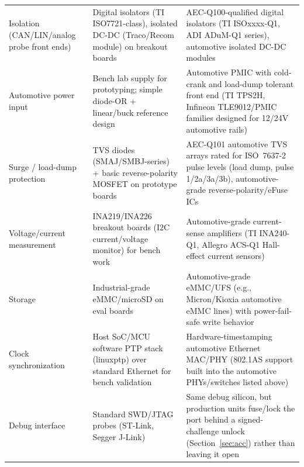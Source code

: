 \begin{center}
\begin{tabularx}{\linewidth}{@{}p{2.6cm} X X@{}}
Isolation (CAN/LIN/analog probe front ends) & Digital isolators (TI ISO7721-class), isolated DC-DC (Traco/Recom module) on breakout boards & AEC-Q100-qualified digital isolators (TI ISOxxxx-Q1, ADI ADuM-Q1 series), automotive isolated DC-DC modules \\
Automotive power input & Bench lab supply for prototyping; simple diode-OR + linear/buck reference design & Automotive PMIC with cold-crank and load-dump tolerant front end (TI TPS2H, Infineon TLE9012/PMIC families designed for 12/24V automotive rails) \\
Surge / load-dump protection & TVS diodes (SMAJ/SMBJ-series) + basic reverse-polarity MOSFET on prototype boards & AEC-Q101 automotive TVS arrays rated for ISO~7637-2 pulse levels (load dump, pulse 1/2a/3a/3b), automotive-grade reverse-polarity/eFuse ICs \\
Voltage/current measurement & INA219/INA226 breakout boards (I2C current/voltage monitor) for bench work & Automotive-grade current-sense amplifiers (TI INA240-Q1, Allegro ACS-Q1 Hall-effect current sensors) \\
Storage & Industrial-grade eMMC/microSD on eval boards & Automotive-grade eMMC/UFS (e.g., Micron/Kioxia automotive eMMC lines) with power-fail-safe write behavior \\
Clock synchronization & Host SoC/MCU software PTP stack (linuxptp) over standard Ethernet for bench validation & Hardware-timestamping automotive Ethernet MAC/PHY (802.1AS support built into the automotive PHYs/switches listed above) \\
Debug interface & Standard SWD/JTAG probes (ST-Link, Segger J-Link) & Same debug silicon, but production units fuse/lock the port behind a signed-challenge unlock (Section~\ref{sec:acc}) rather than leaving it open \\
\bottomrule
\end{tabularx}
\end{center}
